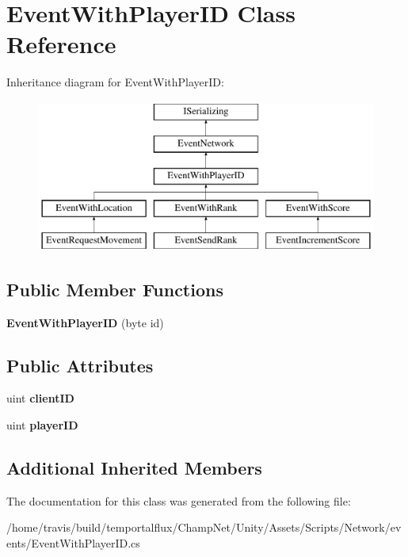 \hypertarget{class_event_with_player_i_d}{\section{Event\-With\-Player\-I\-D Class Reference}
\label{class_event_with_player_i_d}
}
Inheritance diagram for Event\-With\-Player\-I\-D\-:\begin{figure}[H]
\begin{center}
\leavevmode
\includegraphics[height=5.000000cm]{class_event_with_player_i_d}
\end{center}
\end{figure}
\subsection*{Public Member Functions}
\begin{DoxyCompactItemize}
\item 
\hypertarget{class_event_with_player_i_d_a44a3302e35cd05c5501f6e6056be55ea}{{\bfseries Event\-With\-Player\-I\-D} (byte id)}\label{class_event_with_player_i_d_a44a3302e35cd05c5501f6e6056be55ea}

\end{DoxyCompactItemize}
\subsection*{Public Attributes}
\begin{DoxyCompactItemize}
\item 
\hypertarget{class_event_with_player_i_d_abf768ead936c23973ed05335bc346581}{uint {\bfseries client\-I\-D}}\label{class_event_with_player_i_d_abf768ead936c23973ed05335bc346581}

\item 
\hypertarget{class_event_with_player_i_d_a41340c3a625e17bb56c31cc937db338e}{uint {\bfseries player\-I\-D}}\label{class_event_with_player_i_d_a41340c3a625e17bb56c31cc937db338e}

\end{DoxyCompactItemize}
\subsection*{Additional Inherited Members}


The documentation for this class was generated from the following file\-:\begin{DoxyCompactItemize}
\item 
/home/travis/build/temportalflux/\-Champ\-Net/\-Unity/\-Assets/\-Scripts/\-Network/events/Event\-With\-Player\-I\-D.\-cs\end{DoxyCompactItemize}
